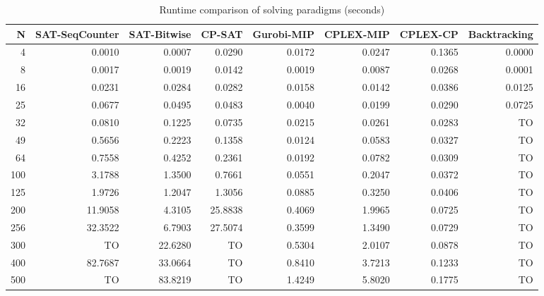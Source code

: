 \begin{table}[htbp]
\centering
\caption{Runtime comparison of solving paradigms (seconds)}
\label{tab:exp3_paradigms}
\begin{tabular}{rrrrrrrr}
\hline
N & SAT-SeqCounter & SAT-Bitwise & CP-SAT & Gurobi-MIP & CPLEX-MIP & CPLEX-CP & Backtracking \\
\hline
4 & 0.0010 & 0.0007 & 0.0290 & 0.0172 & 0.0247 & 0.1365 & 0.0000 \\
8 & 0.0017 & 0.0019 & 0.0142 & 0.0019 & 0.0087 & 0.0268 & 0.0001 \\
16 & 0.0231 & 0.0284 & 0.0282 & 0.0158 & 0.0142 & 0.0386 & 0.0125 \\
25 & 0.0677 & 0.0495 & 0.0483 & 0.0040 & 0.0199 & 0.0290 & 0.0725 \\
32 & 0.0810 & 0.1225 & 0.0735 & 0.0215 & 0.0261 & 0.0283 & TO \\
49 & 0.5656 & 0.2223 & 0.1358 & 0.0124 & 0.0583 & 0.0327 & TO \\
64 & 0.7558 & 0.4252 & 0.2361 & 0.0192 & 0.0782 & 0.0309 & TO \\
100 & 3.1788 & 1.3500 & 0.7661 & 0.0551 & 0.2047 & 0.0372 & TO \\
125 & 1.9726 & 1.2047 & 1.3056 & 0.0885 & 0.3250 & 0.0406 & TO \\
200 & 11.9058 & 4.3105 & 25.8838 & 0.4069 & 1.9965 & 0.0725 & TO \\
256 & 32.3522 & 6.7903 & 27.5074 & 0.3599 & 1.3490 & 0.0729 & TO \\
300 & TO & 22.6280 & TO & 0.5304 & 2.0107 & 0.0878 & TO \\
400 & 82.7687 & 33.0664 & TO & 0.8410 & 3.7213 & 0.1233 & TO \\
500 & TO & 83.8219 & TO & 1.4249 & 5.8020 & 0.1775 & TO \\
\hline
\end{tabular}
\end{table}